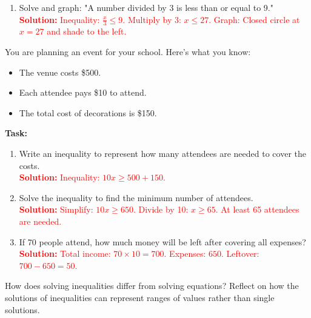 \documentclass[12pt]{article}
\begin{document}
\begin{tcolorbox}[colframe=black!60, colback=white, 
coltitle=black, colbacktitle=black!15, fonttitle=\bfseries\Large, 
title=Problems, halign title=center, left=10pt, right=10pt, top=10pt, bottom=100pt]
\begin{enumerate}[start=9, itemsep=3em]
    \item Solve and graph: "A number divided by 3 is less than or equal to 9."\\
    \textcolor{red}{\textbf{Solution:} Inequality: \( \frac{x}{3} \leq 9 \). Multiply by 3: \( x \leq 27 \). Graph: Closed circle at \( x = 27 \) and shade to the left.}
\end{enumerate}
\end{tcolorbox}

\begin{tcolorbox}[colframe=black!60, colback=white, 
coltitle=black, colbacktitle=black!15, fonttitle=\bfseries\Large, 
title=Performance Task: Budgeting for an Event, halign title=center, left=10pt, right=10pt, top=10pt, bottom=90pt]
You are planning an event for your school. Here’s what you know:
\begin{itemize}
    \item The venue costs \$500.
    \item Each attendee pays \$10 to attend.
    \item The total cost of decorations is \$150.
\end{itemize}
\textbf{Task:}
\begin{enumerate}[itemsep=5em]
    \item Write an inequality to represent how many attendees are needed to cover the costs.\\
    \textcolor{red}{\textbf{Solution:} Inequality: \( 10x \geq 500 + 150 \).}

    \item Solve the inequality to find the minimum number of attendees.\\
    \textcolor{red}{\textbf{Solution:} Simplify: \( 10x \geq 650 \). Divide by 10: \( x \geq 65 \). At least 65 attendees are needed.}

    \item If 70 people attend, how much money will be left after covering all expenses?\\
    \textcolor{red}{\textbf{Solution:} Total income: \( 70 \times 10 = 700 \). Expenses: \( 650 \). Leftover: \( 700 - 650 = 50 \).}
\end{enumerate}
\end{tcolorbox}

\begin{tcolorbox}[colframe=black!60, colback=white, 
coltitle=black, colbacktitle=black!15, fonttitle=\bfseries\Large, 
title=Reflection, halign title=center, left=10pt, right=10pt, top=10pt, bottom=80pt]
How does solving inequalities differ from solving equations? Reflect on how the solutions of inequalities can represent ranges of values rather than single solutions.
\end{tcolorbox}
\end{document}

